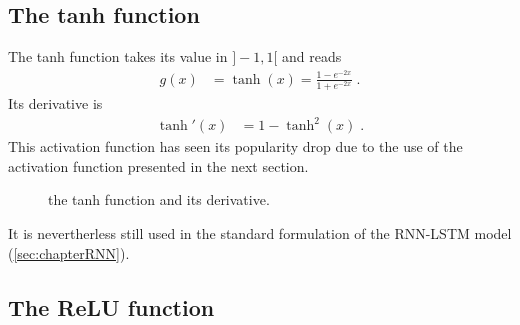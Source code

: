 \subsection{The tanh function}

The tanh function takes its value in $]-1,1[$ and reads
\begin{align}
g(x)&=\tanh(x)=\frac{1-e^{-2x}}{1+e^{-2x}}\;.
\end{align}
Its derivative is
\begin{align}
\tanh'(x)&=1-\tanh^2(x)\;.
\end{align}
This activation function has seen its popularity drop due to the use of the activation function presented in the next section.

\begin{figure}[H]
\begin{center}
\end{center}
\caption{\label{fig:tanh} the tanh function and its derivative.}
\end{figure}

It is nevertherless still used in the standard formulation of the RNN-LSTM model (\ref{sec:chapterRNN}).

\subsection{The ReLU function}


